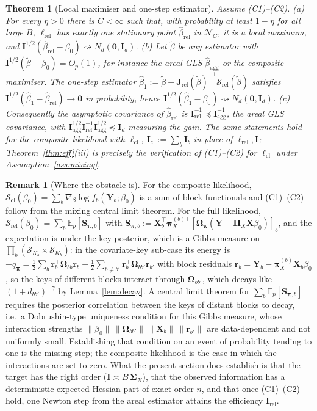\documentclass[11pt]{article}
\newtheorem{theorem}{Theorem}
\theoremstyle{definition}
\newtheorem{remark}{Remark}
\newcommand{\bX}{\mathbf{X}}
\newcommand{\bY}{\mathbf{Y}}
\newcommand{\bS}{\mathbf{S}}
\newcommand{\bI}{\mathbf{I}}
\newcommand{\bzero}{\mathbf{0}}
\newcommand{\bSig}{\boldsymbol{\Sigma}}
\newcommand{\bOm}{\boldsymbol{\Omega}}
\newcommand{\bpi}{\boldsymbol{\pi}}
\newcommand{\bPi}{\boldsymbol{\Pi}}
\newcommand{\E}{\mathbb{E}}
\newcommand{\calS}{\mathcal{S}}
\newcommand{\rel}{\mathrm{rel}}
\newcommand{\agg}{\mathrm{agg}}
\begin{document}
\begin{theorem}[Local maximiser and one-step estimator]\label{thm:onestep}
Assume (C1)--(C2). (a) For every $\eta>0$ there is $C<\infty$ such that, with probability at least $1-\eta$ for all large $B$, $\ell_\rel$ has exactly one stationary point $\hat\beta_\rel$ in $\mathcal N_C$, it is a local maximum, and $\mathbf I^{1/2}(\hat\beta_\rel-\beta_0)\rightsquigarrow N_d(\bzero,\bI_d)$.
(b) Let $\tilde\beta$ be any estimator with $\mathbf I^{1/2}(\tilde\beta-\beta_0)=O_p(1)$, for instance the areal GLS $\hat\beta_\agg$ or the composite maximiser. The one-step estimator $\hat\beta_1:=\tilde\beta+\mathbf J_\rel(\tilde\beta)^{-1}\bm{\mathcal S}_\rel(\tilde\beta)$ satisfies $\mathbf I^{1/2}(\hat\beta_1-\hat\beta_\rel)\to\bzero$ in probability, hence $\mathbf I^{1/2}(\hat\beta_1-\beta_0)\rightsquigarrow N_d(\bzero,\bI_d)$.
(c) Consequently the asymptotic covariance of $\hat\beta_\rel$ is $\mathbf I_\rel^{-1}\preceq\mathbf I_\agg^{-1}$, the areal GLS covariance, with $\mathbf I_\agg^{1/2}\mathbf I_\rel^{-1}\mathbf I_\agg^{1/2}\preceq\bI_d$ measuring the gain.
The same statements hold for the composite likelihood with $\ell_{\mathrm{cl}}$, $\mathbf I_{\mathrm{cl}}:=\sum_b\mathbf I_b$ in place of $\ell_\rel,\mathbf I$; Theorem~\ref{thm:eff}(iii) is precisely the verification of (C1)--(C2) for $\ell_{\mathrm{cl}}$ under Assumption~\ref{ass:mixing}.
\end{theorem}

\begin{remark}[Where the obstacle is]\label{rem:obstacle}
For the composite likelihood, $\bm{\mathcal S}_{\mathrm{cl}}(\beta_0)=\sum_b\nabla_\beta\log f_b(\bY_b;\beta_0)$ is a sum of block functionals and (C1)--(C2) follow from the mixing central limit theorem. For the full likelihood, $\bm{\mathcal S}_\rel(\beta_0)=\sum_b\E_p[\bS_{\bpi,b}]$ with $\bS_{\bpi,b}:=\bX_b^\top\bpi_X^{(b)\top}[\bOm_{\bpi}(\bY-\bPi_X\bX\beta_0)]_b$, and the expectation is under the key posterior, which is a Gibbs measure on $\prod_b(\calS_{K_b}\times\calS_{K_b})$: in the covariate-key sub-case its energy is $-q_{\bpi}=\tfrac12\sum_b\bm r_b^\top\bOm_{bb}\bm r_b+\tfrac12\sum_{b\ne b'}\bm r_b^\top\bOm_{bb'}\bm r_{b'}$ with block residuals $\bm r_b=\bY_b-\bpi_X^{(b)}\bX_b\beta_0$, so the keys of different blocks interact through $\bOm_{bb'}$, which decays like $(1+d_{bb'})^{-\gamma}$ by Lemma~\ref{lem:decay}. A central limit theorem for $\sum_b\E_p[\bS_{\bpi,b}]$ requires the posterior correlation between the keys of distant blocks to decay, i.e.\ a Dobrushin-type uniqueness condition for this Gibbs measure, whose interaction strengths $\|\beta_0\|\,\|\bOm_{bb'}\|\,\|\bX_b\|\,\|\bm r_{b'}\|$ are data-dependent and not uniformly small. Establishing that condition on an event of probability tending to one is the missing step; the composite likelihood is the case in which the interactions are set to zero. What the present section does establish is that the target has the right order ($\mathbf I\asymp B\,\bSig_X$), that the observed information has a deterministic expected-Hessian part of exact order $n$, and that once (C1)--(C2) hold, one Newton step from the areal estimator attains the efficiency $\mathbf I_\rel$.
\end{remark}
\end{document}
